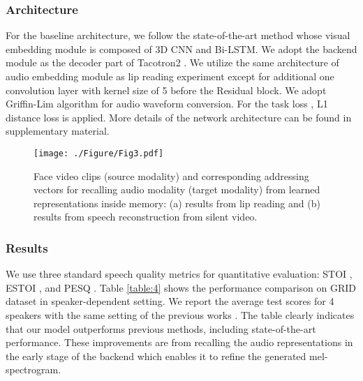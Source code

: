\documentclass[10pt,twocolumn,letterpaper]{article}
\begin{document}
\vspace{-0.2cm}
\subsubsection{Architecture}
\vspace{-0.2cm}
For the baseline architecture, we follow the state-of-the-art method \cite{l2w} whose visual embedding module is composed of 3D CNN and Bi-LSTM. We adopt the backend module as the decoder part of Tacotron2 \cite{tacotron2}. We utilize the same architecture of audio embedding module as lip reading experiment except for additional one convolution layer with kernel size of 5 before the Residual block. We adopt Griffin-Lim \cite{griffinlim} algorithm for audio waveform conversion. For the task loss , L1 distance loss is applied.
More details of the network architecture can be found in supplementary material.

\begin{figure*}[t!]
	\begin{minipage}[b]{1.0\linewidth}
		\centering
		\centerline{\texttt{[image: ./Figure/Fig3.pdf]}}
	\end{minipage}
	\caption{Face video clips (source modality) and corresponding addressing vectors for recalling audio modality (target modality) from learned representations inside memory: (a) results from lip reading and (b) results from speech reconstruction from silent video.}
	\label{fig:3}
	\vspace{-0.3cm}
\end{figure*}


\vspace{-0.2cm}
\subsubsection{Results}
\vspace{-0.2cm}
We use three standard speech quality metrics for quantitative evaluation: STOI \cite{stoi}, ESTOI \cite{estoi}, and PESQ \cite{pesq}. Table \ref{table:4} shows the performance comparison on GRID dataset in speaker-dependent setting. We report the average test scores for 4 speakers with the same setting of the previous works \cite{akbari2018lip2audspec, ganbased, ephrat2017improved, l2w, yadav2020speech}. The table clearly indicates that our model outperforms previous methods, including state-of-the-art performance. These improvements are from recalling the audio representations in the early stage of the backend which enables it to refine the generated mel-spectrogram.
\end{document}
